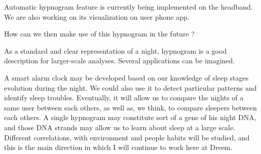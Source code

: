 \documentclass[12pt]{report}
\begin{document}
Automatic hypnogram feature is currently being implemented on the headband. We are also working on its visualization on user phone app.

How can we then make use of this hypnogram in the future ?

As a standard and clear representation of a night, hypnogram is a good description for larger-scale analyses. Several applications can be imagined.

A smart alarm clock may be developed based on our knowledge of sleep stages evolution during the night. We could also use it to detect particular patterns and identify sleep troubles. Eventually, it will allow us to compare the nights of a same user between each others, as well as, we think, to compare sleepers between each others. A single hypnogram may constitute sort of a gene of his night DNA, and those DNA strands may allow us to learn about sleep at a large scale. Different correlations, with environment and people habits will be studied, and this is the main direction in which I will continue to work here at Dreem.


\renewcommand\appendixpagename{Mathematical appendices}
\renewcommand\appendixtocname{Mathematical appendices}
\end{document}
